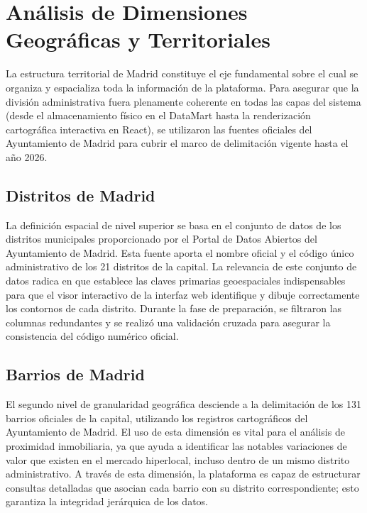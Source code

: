 \documentclass[a4paper,11pt,openany]{book}
\begin{document}
\section{Análisis de Dimensiones Geográficas y Territoriales}
La estructura territorial de Madrid constituye el eje fundamental sobre el cual se organiza y espacializa toda la información de la plataforma. Para asegurar que la división administrativa fuera plenamente coherente en todas las capas del sistema (desde el almacenamiento físico en el DataMart hasta la renderización cartográfica interactiva en React), se utilizaron las fuentes oficiales del Ayuntamiento de Madrid para cubrir el marco de delimitación vigente hasta el año 2026.

\subsection{Distritos de Madrid}
La definición espacial de nivel superior se basa en el conjunto de datos de los distritos municipales proporcionado por el Portal de Datos Abiertos del Ayuntamiento de Madrid. Esta fuente aporta el nombre oficial y el código único administrativo de los 21 distritos de la capital. La relevancia de este conjunto de datos radica en que establece las claves primarias geoespaciales indispensables para que el visor interactivo de la interfaz web identifique y dibuje correctamente los contornos de cada distrito. Durante la fase de preparación, se filtraron las columnas redundantes y se realizó una validación cruzada para asegurar la consistencia del código numérico oficial.

\begin{table}[h!]
\centering
\renewcommand{\arraystretch}{1.5}
\caption{Fuentes de datos oficiales para la dimensión de distrito.}
\end{table}

\subsection{Barrios de Madrid}
El segundo nivel de granularidad geográfica desciende a la delimitación de los 131 barrios oficiales de la capital, utilizando los registros cartográficos del Ayuntamiento de Madrid. El uso de esta dimensión es vital para el análisis de proximidad inmobiliaria, ya que ayuda a identificar las notables variaciones de valor que existen en el mercado hiperlocal, incluso dentro de un mismo distrito administrativo. A través de esta dimensión, la plataforma es capaz de estructurar consultas detalladas que asocian cada barrio con su distrito correspondiente; esto garantiza la integridad jerárquica de los datos.
\end{document}
